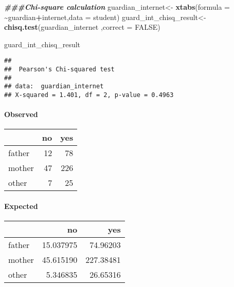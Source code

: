 \documentclass[
]{book}
\newenvironment{Shaded}{\begin{snugshade}}{\end{snugshade}}
\newcommand{\AttributeTok}[1]{\textcolor[rgb]{0.13,0.29,0.53}{#1}}
\newcommand{\ConstantTok}[1]{\textcolor[rgb]{0.56,0.35,0.01}{#1}}
\newcommand{\DocumentationTok}[1]{\textcolor[rgb]{0.56,0.35,0.01}{\textbf{\textit{#1}}}}
\newcommand{\FunctionTok}[1]{\textcolor[rgb]{0.13,0.29,0.53}{\textbf{#1}}}
\newcommand{\NormalTok}[1]{#1}
\newcommand{\OtherTok}[1]{\textcolor[rgb]{0.56,0.35,0.01}{#1}}
\newcommand{\SpecialCharTok}[1]{\textcolor[rgb]{0.81,0.36,0.00}{\textbf{#1}}}
\theoremstyle{definition}
\theoremstyle{definition}
\theoremstyle{definition}
\theoremstyle{definition}
\theoremstyle{remark}
\begin{document}
\begin{Shaded}
\begin{Highlighting}[]
\DocumentationTok{\#\#\#Chi{-}square calculation}
\NormalTok{guardian\_internet}\OtherTok{\textless{}{-}} \FunctionTok{xtabs}\NormalTok{(}\AttributeTok{formula =} \SpecialCharTok{\textasciitilde{}}\NormalTok{guardian}\SpecialCharTok{+}\NormalTok{internet,}\AttributeTok{data =}\NormalTok{ student)}
\NormalTok{guard\_int\_chisq\_result}\OtherTok{\textless{}{-}} \FunctionTok{chisq.test}\NormalTok{(guardian\_internet ,}\AttributeTok{correct =} \ConstantTok{FALSE}\NormalTok{)}

\NormalTok{guard\_int\_chisq\_result}
\end{Highlighting}
\end{Shaded}

\begin{verbatim}
## 
##  Pearson's Chi-squared test
## 
## data:  guardian_internet
## X-squared = 1.401, df = 2, p-value = 0.4963
\end{verbatim}

\hypertarget{observed}{%
\paragraph{Observed}\label{observed}}

\begin{table}
\centering
\begin{tabular}{l|r|r}
\hline
  & no & yes\\
\hline
father & 12 & 78\\
\hline
mother & 47 & 226\\
\hline
other & 7 & 25\\
\hline
\end{tabular}
\end{table}

\hypertarget{expected}{%
\paragraph{Expected}\label{expected}}

\begin{table}
\centering
\begin{tabular}{l|r|r}
\hline
  & no & yes\\
\hline
father & 15.037975 & 74.96203\\
\hline
mother & 45.615190 & 227.38481\\
\hline
other & 5.346835 & 26.65316\\
\hline
\end{tabular}
\end{table}
\end{document}
